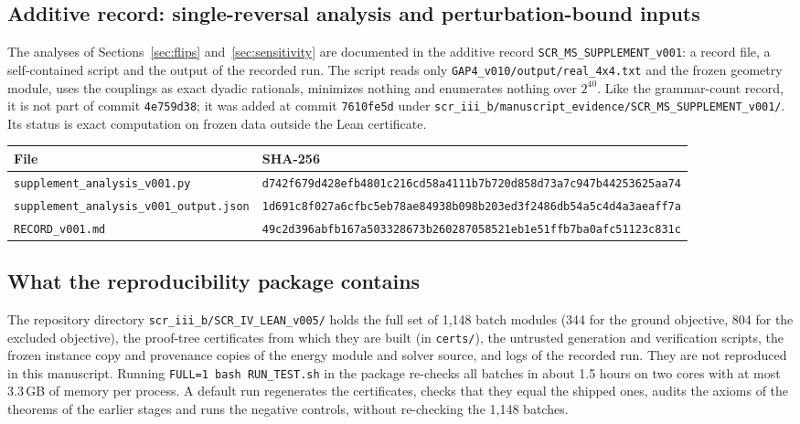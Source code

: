 \documentclass[11pt,a4paper]{article}
\theoremstyle{plain}
\theoremstyle{definition}
\theoremstyle{remark}
\newcommand{\lean}[1]{\nolinkurl{#1}}
\begin{document}
\subsection{Additive record: single-reversal analysis and perturbation-bound inputs}
The analyses of Sections~\ref{sec:flips} and~\ref{sec:sensitivity} are documented in the additive record \lean{SCR_MS_SUPPLEMENT_v001}: a record file, a self-contained script and the output of the recorded run. The script reads only \lean{GAP4_v010/output/real_4x4.txt} and the frozen geometry module, uses the couplings as exact dyadic rationals, minimizes nothing and enumerates nothing over $2^{40}$. Like the grammar-count record, it is not part of commit \texttt{4e759d38}; it was added at commit \texttt{7610fe5d} under \lean{scr_iii_b/manuscript_evidence/SCR_MS_SUPPLEMENT_v001/}. Its status is exact computation on frozen data outside the Lean certificate.
\begin{center}\small
\begin{tabularx}{\linewidth}{@{}p{5cm}X@{}}
\toprule
File & SHA-256\\
\midrule
\lean{supplement_analysis_v001.py} & \texttt{d742f679d428efb4801c216cd58a4111}\newline\texttt{b7b720d858d73a7c947b44253625aa74}\\
\lean{supplement_analysis_v001_output.json} & \texttt{1d691c8f027a6cfbc5eb78ae84938b09}\newline\texttt{8b203ed3f2486db54a5c4d4a3aeaff7a}\\
\lean{RECORD_v001.md} & \texttt{49c2d396abfb167a503328673b260287}\newline\texttt{058521eb1e51ffb7ba0afc51123c831c}\\
\bottomrule
\end{tabularx}
\end{center}

\subsection{What the reproducibility package contains}
The repository directory \lean{scr_iii_b/SCR_IV_LEAN_v005/} holds the full set of 1{,}148 batch modules (344 for the ground objective, 804 for the excluded objective), the proof-tree certificates from which they are built (in \lean{certs/}), the untrusted generation and verification scripts, the frozen instance copy and provenance copies of the energy module and solver source, and logs of the recorded run. They are not reproduced in this manuscript. Running \texttt{FULL=1 bash RUN\_TEST.sh} in the package re-checks all batches in about 1.5 hours on two cores with at most 3.3\,GB of memory per process. A default run regenerates the certificates, checks that they equal the shipped ones, audits the axioms of the theorems of the earlier stages and runs the negative controls, without re-checking the 1{,}148 batches.
\end{document}
